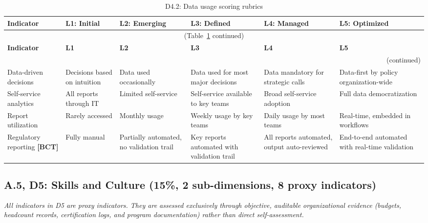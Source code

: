 \begin{center}
{\small
\begin{longtable}{|p{2.4cm}|p{2.0cm}|p{2.0cm}|p{2.2cm}|p{2.2cm}|p{2.2cm}|}
\caption{D4.2: Data usage scoring rubrics} \label{tab:d4-2} \\
\hline
\textbf{Indicator} & \textbf{L1: Initial} & \textbf{L2: Emerging} & \textbf{L3: Defined} & \textbf{L4: Managed} & \textbf{L5: Optimized} \\
\hline
\endfirsthead
\multicolumn{6}{c}{\small (Table~\ref{tab:d4-2} continued)} \\
\hline
\textbf{Indicator} & \textbf{L1} & \textbf{L2} & \textbf{L3} & \textbf{L4} & \textbf{L5} \\
\hline
\endhead
\hline
\multicolumn{6}{r}{\small (continued)} \\
\endfoot
\hline
\endlastfoot
Data-driven decisions &
  Decisions based on intuition &
  Data used occasionally &
  Data used for most major decisions &
  Data mandatory for strategic calls &
  Data-first by policy organization-wide \\
\hline
Self-service analytics &
  All reports through IT &
  Limited self-service &
  Self-service available to key teams &
  Broad self-service adoption &
  Full data democratization \\
\hline
Report utilization &
  Rarely accessed &
  Monthly usage &
  Weekly usage by key teams &
  Daily usage by most teams &
  Real-time, embedded in workflows \\
\hline
Regulatory reporting \textbf{[BCT]} &
  Fully manual &
  Partially automated, no validation trail &
  Key reports automated with validation trail &
  All reports automated, output auto-reviewed &
  End-to-end automated with real-time validation \\
\hline
\end{longtable}
}
\end{center}


\subsection*{A.5, D5: Skills and Culture (15\%, 2 sub-dimensions, 8 proxy indicators)}

\noindent \textit{All indicators in D5 are proxy indicators. They are assessed exclusively through objective, auditable organizational evidence (budgets, headcount records, certification logs, and program documentation) rather than direct self-assessment.}


